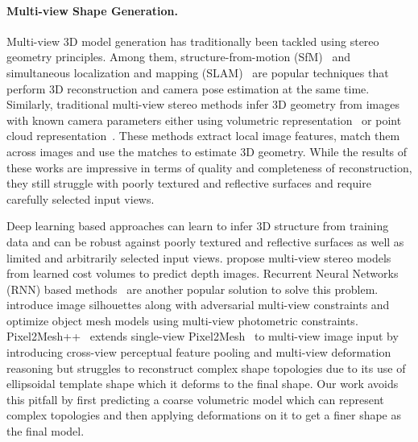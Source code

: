 \paragraph{Multi-view Shape Generation.}
Multi-view 3D model generation has traditionally been tackled using stereo geometry principles.
Among them, structure-from-motion (SfM)~\cite{schonberger2016structure,agarwal2011building,cui2015global,cui2017hsfm} and simultaneous localization and mapping (SLAM)~\cite{cadena2016pastslam,mur2015orb,engel2014lsd,whelan2015elasticfusion} are popular techniques that perform 3D reconstruction and camera pose estimation at the same time.
Similarly, traditional multi-view stereo methods infer 3D geometry from images with known camera parameters either using
volumetric representation~\cite{kutulakos2000theory, seitz1999photorealistic} or
point cloud representation~\cite{furukawa2009accurate, lhuillier2005quasi}.
These methods extract local image features, match them across images and use the matches to estimate 3D geometry.
While the results of these works are impressive in terms of quality and completeness of reconstruction, they still struggle with poorly textured and reflective surfaces and require carefully selected input views.

Deep learning based approaches can learn to infer 3D structure from training data and can be robust against poorly textured and reflective surfaces as well as limited and arbitrarily selected input views.
\cite{hartmann2017learned_16,deepmvs2018,yao2018mvsnet,chen2019point,luo2019pmvsnet,gu2019cascade,yao2019recurrent} propose multi-view stereo models from learned cost volumes to predict depth images.
Recurrent Neural Networks (RNN) based methods~\cite{3dr2n2, kar2017lsm, mcrecon2017} are another popular solution to solve this problem.
\cite{mcrecon2017, lin2019photometric} introduce image silhouettes along with adversarial multi-view constraints and optimize object mesh models using multi-view photometric constraints.
Pixel2Mesh++~\cite{wen2019pixel2mesh++} extends single-view Pixel2Mesh~\cite{wang2018pixel2mesh} to multi-view image input by introducing cross-view perceptual feature pooling and multi-view deformation reasoning but struggles to reconstruct complex shape topologies due to its use of ellipsoidal template shape which it deforms to the final shape.
Our work avoids this pitfall by first predicting a coarse volumetric model which can represent complex topologies and then applying deformations on it to get a finer shape as the final model.


